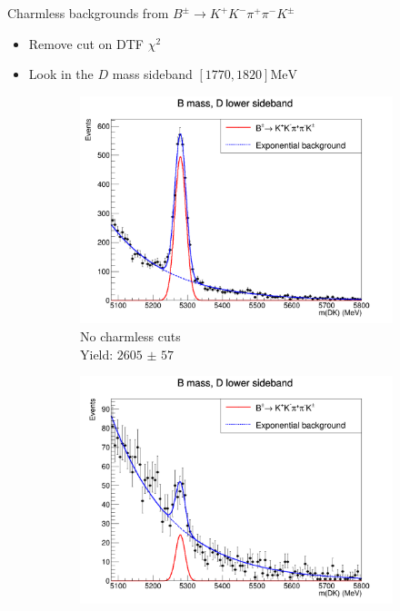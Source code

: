\documentclass{beamer}
\begin{document}
\begin{frame}{Charmless backgrounds from \texorpdfstring{$B^\pm\to K^+K^-\pi^+\pi^-K^\pm$}{B to K K pi pi K}}
  \begin{itemize}
    \item{Remove cut on DTF $\chi^2$}
    \item{Look in the $D$ mass sideband $[1770, 1820]\si{\mega\eV}$}
  \end{itemize}
  \begin{figure}
    \centering
    \vspace{-0.2cm}
    \begin{subfigure}{0.5\textwidth}
      \includegraphics[width = 1.0\textwidth]{Plots/B2DKLower_Charmless.png}
      \caption{No charmless cuts \\Yield: $\SI{2605(57)}{}$}
    \end{subfigure}%
    \begin{subfigure}{0.5\textwidth}
      \includegraphics[width = 1.0\textwidth]{Plots/B2DKLowerFDCut_Charmless.png}

\end{subfigure}
\end{figure}
\end{frame}
\end{document}
